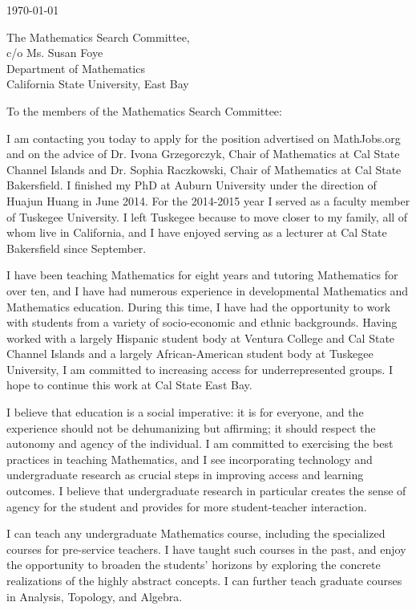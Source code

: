 \documentclass[10pt]{article}
\begin{document}

\today

The Mathematics Search Committee,\\
c/o Ms. Susan Foye\\
Department of Mathematics\\
California State University, East Bay

To the members of the Mathematics Search Committee:

I am contacting you today to apply for the position advertised on MathJobs.org
and on the advice of Dr. Ivona Grzegorczyk, Chair of Mathematics at Cal State Channel Islands
and Dr. Sophia Raczkowski, Chair of Mathematics at Cal State Bakersfield.
I finished my PhD at Auburn University under the direction of Huajun Huang in June 2014.
For the 2014-2015 year I served as a faculty member of Tuskegee University.
I left Tuskegee because to move closer to my family, all of whom live in California,
and I have enjoyed serving as a lecturer at Cal State Bakersfield since September.

I have been teaching Mathematics for eight years and tutoring Mathematics for over ten,
and I have had numerous experience in developmental Mathematics and Mathematics education.
During this time, I have had the opportunity to work with students from a variety of
socio-economic and ethnic backgrounds.
Having worked with a largely Hispanic student body at Ventura College and Cal State Channel
Islands and a largely African-American student body at Tuskegee University,
I am committed to increasing access for underrepresented groups.
I hope to continue this work at Cal State East Bay.

I believe that education is a social imperative:
it is for everyone, and the experience should not be dehumanizing but affirming;
it should respect the autonomy and agency of the individual.
I am committed to exercising the best practices in teaching Mathematics,
and I see incorporating technology and undergraduate research as crucial steps in improving access
and learning outcomes.
I believe that undergraduate research in particular creates the sense of agency for the student
and provides for more student-teacher interaction.

I can teach any undergraduate Mathematics course, including the specialized courses for
pre-service teachers.
I have taught such courses in the past, and enjoy the opportunity to broaden the students' horizons
by exploring the concrete realizations of the highly abstract concepts.
I can further teach graduate courses in Analysis, Topology, and Algebra.
\end{document}
